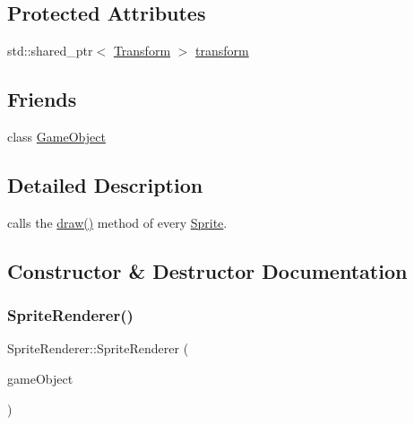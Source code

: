 \subsection*{Protected Attributes}
\begin{DoxyCompactItemize}
\item 
std\+::shared\+\_\+ptr$<$ \hyperlink{class_mason_1_1_transform}{Transform} $>$ \hyperlink{class_mason_1_1_sprite_renderer_a6f117cc02c8fc27dac5692a2127bf329}{transform}
\end{DoxyCompactItemize}
\subsection*{Friends}
\begin{DoxyCompactItemize}
\item 
class \hyperlink{class_mason_1_1_sprite_renderer_a00df87c957d8f7ee0fc51f07a0542f4a}{Game\+Object}
\end{DoxyCompactItemize}


\subsection{Detailed Description}
calls the \hyperlink{class_mason_1_1_sprite_renderer_aeeeaa7eb5c340b7c2abad3d4785fd1e1}{draw()} method of every \hyperlink{class_mason_1_1_sprite}{Sprite}. 

\subsection{Constructor \& Destructor Documentation}
\hypertarget{class_mason_1_1_sprite_renderer_a82f81ad1b56677f6194d91956b213add}{}\label{class_mason_1_1_sprite_renderer_a82f81ad1b56677f6194d91956b213add} 
\subsubsection{\texorpdfstring{Sprite\+Renderer()}{SpriteRenderer()}}
{\footnotesize\ttfamily Sprite\+Renderer\+::\+Sprite\+Renderer (\begin{DoxyParamCaption}\item[{\hyperlink{class_mason_1_1_game_object}{Game\+Object} $\ast$}]{game\+Object }\end{DoxyParamCaption})\hspace{0.3cm}{\ttfamily [protected]}}

